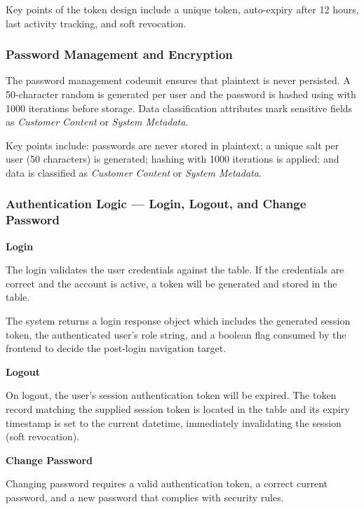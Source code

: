 Key points of the token design include a unique  token,
auto-expiry after 12 hours, last activity tracking, and soft revocation.

\subsubsection{Password Management and Encryption}

The password management codeunit ensures that plaintext is never persisted. A
50-character random  is generated per user and the password is
hashed using  with 1000 iterations before storage.
Data classification attributes mark sensitive fields as \emph{Customer Content}
or \emph{System Metadata}.

Key points include: passwords are never stored in plaintext; a unique salt per user
(50 characters) is generated;  hashing with 1000 iterations is
applied; and data is classified as \emph{Customer Content} or \emph{System Metadata}.

\subsubsection{Authentication Logic --- Login, Logout, and Change Password}

\textbf{Login}

The login validates the user credentials against the 
table. If the credentials are correct and the account is active, a token will
be generated and stored in the  table.

The system returns a  login response object which includes the
generated session token, the authenticated user's role string, and a boolean
 flag consumed by the  frontend
to decide the post-login navigation target.

\textbf{Logout}

On logout, the user's session authentication token will be expired. The token
record matching the supplied session token is located in the
 table and its expiry timestamp is set to the current
datetime, immediately invalidating the session (soft revocation).

\textbf{Change Password}

Changing password requires a valid authentication token, a correct current
password, and a new password that complies with security rules.

